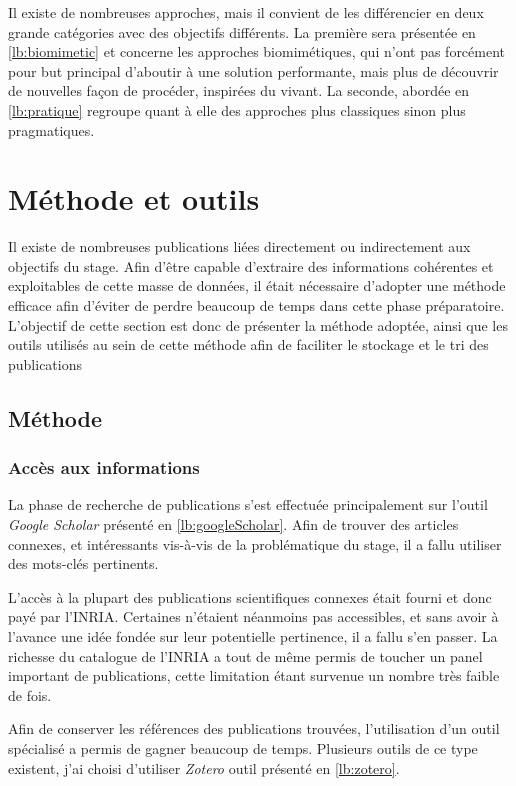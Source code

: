 \documentclass{tnreport}
\begin{document}
Il existe de nombreuses approches, mais il convient de les différencier en deux grande catégories avec des objectifs différents. La première sera présentée en \ref{lb:biomimetic} et concerne les approches biomimétiques, qui n'ont pas forcément pour but principal d'aboutir à une solution performante, mais plus de découvrir de nouvelles façon de procéder, inspirées du vivant. La seconde, abordée en \ref{lb:pratique} regroupe quant à elle des approches plus classiques sinon plus pragmatiques.  

\section{Méthode et outils}
Il existe de nombreuses publications liées directement ou indirectement aux objectifs du stage. Afin d'être capable d'extraire des informations cohérentes et exploitables de cette masse de données, il était nécessaire d'adopter une méthode efficace afin d'éviter de perdre beaucoup de temps dans cette phase préparatoire. L'objectif de cette section est donc de présenter la méthode adoptée, ainsi que les outils utilisés au sein de cette méthode afin de faciliter le stockage et le tri des publications 

\subsection{Méthode}
\subsubsection{Accès aux informations}
La phase de recherche de publications s'est effectuée principalement sur l'outil \textit{Google Scholar} présenté en \ref{lb:googleScholar}. Afin de trouver des articles connexes, et intéressants vis-à-vis de la problématique du stage, il a fallu utiliser des mots-clés pertinents. 
 
L'accès à la plupart des publications scientifiques connexes était fourni et donc payé par l'\gls{INRIA}. Certaines n'étaient néanmoins pas accessibles, et sans avoir à l'avance une idée fondée sur leur potentielle pertinence, il a fallu s'en passer. La richesse du catalogue de l'\gls{INRIA} a tout de même permis de toucher un panel important de publications, cette limitation étant survenue un nombre très faible de fois. 

Afin de conserver les références des publications trouvées, l'utilisation d'un outil spécialisé a permis de gagner beaucoup de temps. Plusieurs outils de ce type existent, j'ai choisi d'utiliser \textit{Zotero} outil présenté en \ref{lb:zotero}.
\end{document}
